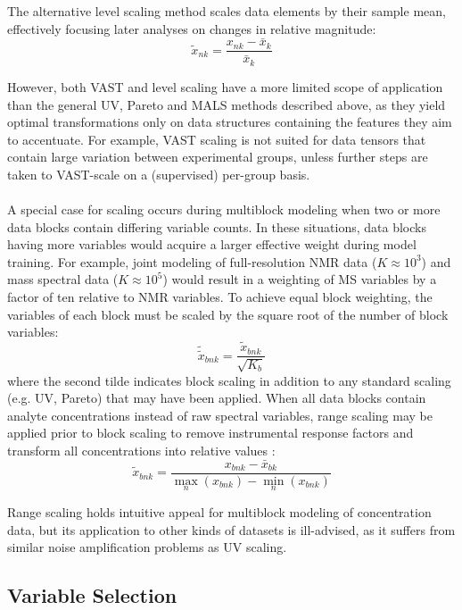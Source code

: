 \begin{doublespace}
The alternative level scaling method scales data elements by their sample mean,
effectively focusing later analyses on changes in relative magnitude:
\begin{equation}
\tilde{x}_{nk} = \frac{x_{nk} - \bar{x}_k}{\bar{x}_k}
\end{equation}

However, both VAST and level scaling have a more limited scope of
application than the general UV, Pareto and MALS methods described above, as
they yield optimal transformations only on data structures containing the
features they aim to accentuate. For example, VAST scaling is not suited for
data tensors that contain large variation between experimental groups, unless
further steps are taken to VAST-scale on a (supervised) per-group basis.
\\\\
A special case for scaling occurs during multiblock modeling when two or more
data blocks contain differing variable counts. In these situations, data blocks
having more variables would acquire a larger effective weight during model
training. For example, joint modeling of full-resolution \hnmr{} NMR data
($K \approx 10^3$) and mass spectral data ($K \approx 10^5$) would result in
a weighting of MS variables by a factor of ten relative to NMR variables. To
achieve equal block weighting, the variables of each block must be scaled by
the square root of the number of block variables:
\begin{equation}
\tilde{\tilde{x}}_{bnk} = \frac{\tilde{x}_{bnk}}{\sqrt{K_b}}
\end{equation}
where the second tilde indicates block scaling in addition to any standard
scaling (e.g. UV, Pareto) that may have been applied. When all data blocks
contain analyte concentrations instead of raw spectral variables, range
scaling may be applied prior to block scaling to remove instrumental response
factors and transform all concentrations into relative values
\cite{smilde:anchem2005}:
\begin{equation}
\tilde{x}_{bnk}
 = \frac{x_{bnk} - \bar{x}_{bk}}
        {\max_n(x_{bnk}) - \min_n(x_{bnk})}
\end{equation}

Range scaling holds intuitive appeal for multiblock modeling of concentration
data, but its application to other kinds of datasets is ill-advised, as it
suffers from similar noise amplification problems as UV scaling.
\end{doublespace}

\subsection{Variable Selection}

